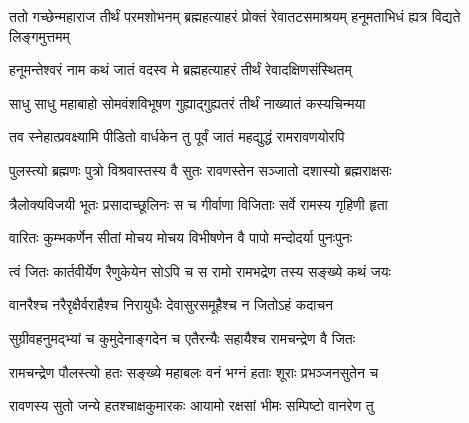 
\vakta{}
\shrota{}
\tags{}
\notes{}

\storymeta






\threelineshloka
{ततो गच्छेन्महाराज तीर्थं परमशोभनम्}
{ब्रह्महत्याहरं प्रोक्तं रेवातटसमाश्रयम्}
{हनूमताभिधं ह्यत्र विद्यते लिङ्गमुत्तमम्}%


\twolineshloka
{हनूमन्तेश्वरं नाम कथं जातं वदस्व मे}
{ब्रह्महत्याहरं तीर्थं रेवादक्षिणसंस्थितम्}%


\twolineshloka
{साधु साधु महाबाहो सोमवंशविभूषण}
{गुह्याद्गुह्यतरं तीर्थं नाख्यातं कस्यचिन्मया}%

\twolineshloka
{तव स्नेहात्प्रवक्ष्यामि पीडितो वार्धकेन तु}
{पूर्वं जातं महद्युद्धं रामरावणयोरपि}%

\twolineshloka
{पुलस्त्यो ब्रह्मणः पुत्रो विश्रवास्तस्य वै सुतः}
{रावणस्तेन सञ्जातो दशास्यो ब्रह्मराक्षसः}%

\twolineshloka
{त्रैलोक्यविजयी भूतः प्रसादाच्छूलिनः स च}
{गीर्वाणा विजिताः सर्वे रामस्य गृहिणी हृता}%

\twolineshloka
{वारितः कुम्भकर्णेन सीतां मोचय मोचय}
{विभीषणेन वै पापो मन्दोदर्या पुनःपुनः}%

\twolineshloka
{त्वं जितः कार्तवीर्येण रैणुकेयेन सोऽपि च}
{स रामो रामभद्रेण तस्य सङ्ख्ये कथं जयः}%


\twolineshloka
{वानरैश्च नरैरृक्षैर्वराहैश्च निरायुधैः}
{देवासुरसमूहैश्च न जितोऽहं कदाचन}%


\twolineshloka
{सुग्रीवहनुमद्भ्यां च कुमुदेनाङ्गदेन च}
{एतैरन्यैः सहायैश्च रामचन्द्रेण वै जितः}%

\twolineshloka
{रामचन्द्रेण पौलस्त्यो हतः सङ्ख्ये महाबलः}
{वनं भग्नं हताः शूराः प्रभञ्जनसुतेन च}%

\twolineshloka
{रावणस्य सुतो जन्ये हतश्चाक्षकुमारकः}
{आयामो रक्षसां भीमः सम्पिष्टो वानरेण तु}%

